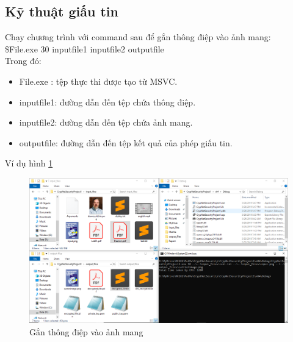 \documentclass[a4paper]{article}
\begin{document}
    \subsection{Kỹ thuật giấu tin}
    Chạy chương trình với command sau để gắn thông điệp vào ảnh mang:\\
    \$File.exe 30 inputfile1 inputfile2 outputfile\\
    Trong đó:
    \begin{itemize}
        \item File.exe : tệp thực thi được tạo từ MSVC.
        \item inputfile1: đường dẫn đến tệp chứa thông điệp.
        \item inputfile2: đường dẫn đến tệp chứa ảnh mang.
        \item outputfile: đường dẫn đến tệp kết quả của phép giấu tin.
    \end{itemize}
    Ví dụ hình \ref{fig:steen}
    \begin{figure}[htp]
        \centering
        \includegraphics[scale=0.4]{steen.png}
        \caption{Gắn thông điệp vào ảnh mang}
        \label{fig:steen}
    \end{figure}
\end{document}
